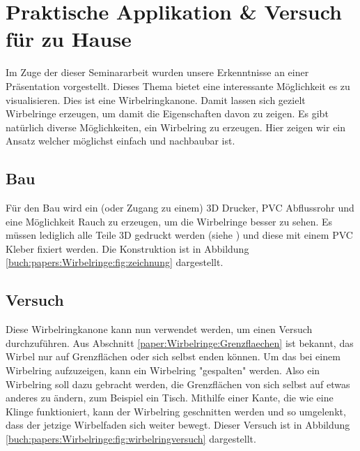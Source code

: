 %
%
%
\section{Praktische Applikation \& Versuch für zu Hause}

Im Zuge der dieser Seminararbeit wurden unsere Erkenntnisse an einer Präsentation vorgestellt. 
Dieses Thema bietet eine interessante Möglichkeit es zu visualisieren. 
Dies ist eine Wirbelringkanone. 
Damit lassen sich gezielt Wirbelringe erzeugen, um damit die Eigenschaften davon zu zeigen. 
Es gibt natürlich diverse Möglichkeiten, ein Wirbelring zu erzeugen. 
Hier zeigen wir ein Ansatz welcher möglichst einfach und nachbaubar ist.

\subsection{Bau}


Für den Bau wird ein (oder Zugang zu einem) 3D Drucker,  PVC Abflussrohr und eine Möglichkeit Rauch zu erzeugen, um die Wirbelringe besser zu sehen. 
Es müssen lediglich alle Teile 3D gedruckt werden (siehe \cite{Wirbelringe:3D_modelle}) und diese mit einem PVC Kleber fixiert werden. 
Die Konstruktion ist in Abbildung \ref{buch:papers:Wirbelringe:fig:zeichnung} dargestellt.

\subsection{Versuch}

Diese Wirbelringkanone kann nun verwendet werden, um einen Versuch durchzuführen. 
Aus Abschnitt \ref{paper:Wirbelringe:Grenzflaechen} ist bekannt, das Wirbel nur auf Grenzflächen oder sich selbst enden können. 
Um das bei einem Wirbelring aufzuzeigen, kann ein Wirbelring "gespalten" werden. 
Also ein Wirbelring soll dazu gebracht werden, die Grenzflächen von sich selbst auf etwas anderes zu ändern, zum Beispiel ein Tisch. 
Mithilfe einer Kante, die wie eine Klinge funktioniert, kann der Wirbelring geschnitten werden und so umgelenkt, dass der jetzige Wirbelfaden sich weiter bewegt. 
Dieser Versuch ist in Abbildung \ref{buch:papers:Wirbelringe:fig:wirbelringversuch} dargestellt.


